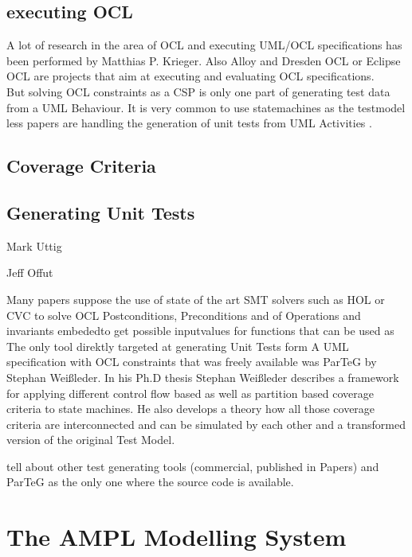 \subsection{executing OCL}
A lot of research in the area of OCL and executing UML/OCL specifications has been performed by Matthias P. Krieger\cite{krieger2008executing}. Also Alloy and Dresden OCL or Eclipse OCL are projects that aim at executing and evaluating OCL specifications. 
\\
But solving OCL constraints as a CSP is only one part of generating test data from a UML Behaviour.
It is very common to use statemachines as the testmodel less papers are handling the generation of unit tests from UML Activities\cite{Linzhang04GeneratingTestCasefromActivityGrayBoxMethod}
\cite{Patel12TestCaseFormationUsigUMLActivityDiagram}
\cite{Pechtanun12GeneratingTestCaseFromUMLActivityDiagramBasedOnACGrammar}
\cite{Xu09ModelCheckingUMLActivities}\cite{Xu09ModelCheckingUMLActivityDiagramsFDR}. 


\subsection{Coverage Criteria}


\subsection{Generating Unit Tests}
Mark Uttig

Jeff Offut

Many papers suppose the use of state of the art SMT solvers such as HOL or CVC to solve OCL Postconditions, Preconditions and  of Operations and invariants embededto get possible inputvalues for functions that can be used as 
The only tool direktly targeted at generating Unit Tests form A UML specification with OCL constraints that was freely available was ParTeG by Stephan Weißleder. In his Ph.D thesis Stephan Weißleder describes a framework for applying different control flow based as well as partition based coverage criteria to state machines. He also develops a theory how all those coverage criteria are interconnected and can be simulated by each other and a transformed version of the original Test Model\cite{ParTeG}.


tell about other test generating tools (commercial, published in Papers) and ParTeG as the only one where the source code is available.\cite{ParTeG}

\section{The AMPL Modelling System}
\cite{AMPL}
